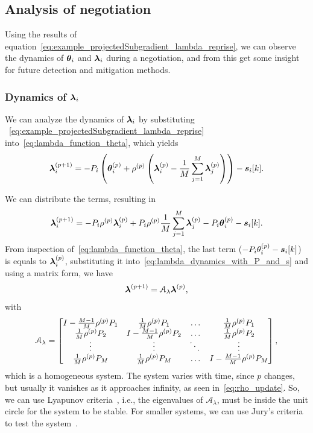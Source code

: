\documentclass[../main.tex]{subfiles}
\begin{document}
\subsection{Analysis of negotiation}\label{sec:analysis-negotiation}
Using the results of equation~\eqref{eq:example_projectedSubgradient_lambda_reprise}, we can observe the dynamics of $\boldsymbol{\theta}_i$ and $\boldsymbol{\lambda}_i$ during a negotiation, and from this get some insight for future detection and mitigation methods.

\subsubsection{Dynamics of $\boldsymbol{\lambda}_i$}
We can analyze the dynamics of $\boldsymbol{\lambda}_i$ by substituting
~\eqref{eq:example_projectedSubgradient_lambda_reprise} into~\eqref{eq:lambda_function_theta}, which yields
\begin{equation}
  \label{eq:lambda_dynamics}
\boldsymbol{\lambda}_i^{(p+1)}=-{P}_{i}\left(\boldsymbol{\theta}_i^{(p)}+\rho^{(p)}\left(\boldsymbol{\lambda}_i^{(p)}-\frac{1}{M}\sum_{j=1}^{M}\boldsymbol{\lambda}_j^{(p)}\right)\right)-\boldsymbol{s}_{i}[k].
\end{equation}

We can distribute the terms, resulting in
\begin{equation}
  \label{eq:lambda_dynamics_with_P_and_s}
\boldsymbol{\lambda}_i^{(p+1)}=-{P}_{i}\rho^{(p)}\boldsymbol{\lambda}_i^{(p)}+{P}_{i}\rho^{(p)}\frac{1}{M}\sum_{j=1}^{M}\boldsymbol{\lambda}_j^{(p)}-{P}_{i}\boldsymbol{\theta}_i^{(p)}-\boldsymbol{s}_{i}[k].
\end{equation}
From inspection of~\eqref{eq:lambda_function_theta}, the last term ($-{P}_{i}\theta_{i}^{(p)}-\boldsymbol{s}_{i}[k]$) is equals to $\boldsymbol{\lambda}_i^{(p)}$, substituting it into~\eqref{eq:lambda_dynamics_with_P_and_s} and using a matrix form, we have
\begin{equation}
  \label{eq:negotiation_equation_substituting_organizing_matrix_lambda}
  \boldsymbol{\lambda}^{(p+1)}=\mathcal{A}_{\lambda}\boldsymbol{\lambda}^{(p)},
\end{equation}
with
\begin{equation}
\mathcal{A}_{\lambda}=\left[
\begin{matrix}
I-\frac{M-1}{M}\rho\p \Plin[1] & \frac{1}{M}\rho\p \Plin[1]&\dots&\frac{1}{M}\rho\p \Plin[1]\\
\frac{1}{M}\rho\p \Plin[2]&I-\frac{M-1}{M}\rho\p \Plin[2]&\dots&\frac{1}{M}\rho\p \Plin[2]\\
\vdots&\vdots&\ddots&\vdots\\
\frac{1}{M}\rho\p \Plin[M]&\frac{1}{M}\rho\p \Plin[M]&\dots&I-\frac{M-1}{M}\rho\p \Plin[M]\\
\end{matrix}
\right],
\end{equation}
which is a \dt{} homogeneous system.
The system varies with time, since $p$ changes, but usually it vanishes as it approaches infinity, as seen in~\eqref{eq:rho_update}.
So, we can use Lyapunov criteria~\cite[\S8.6]{Hespanha2009}, i.e., the eigenvalues of $\mathcal{A}_{\lambda}$, must be inside the unit circle for the system to be stable.
For smaller systems, we can use Jury's criteria to test the system~\cite{Jury1962}.
\end{document}
